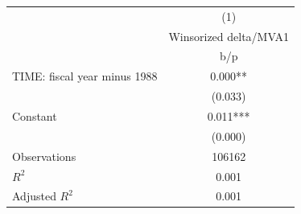 {
\def\sym#1{\ifmmode^{#1}\else\(^{#1}\)\fi}
\begin{tabular}{l*{1}{c}}
\hline\hline
                    &\multicolumn{1}{c}{(1)}\\
                    &\multicolumn{1}{c}{Winsorized delta/MVA1}\\
                    &         b/p   \\
\hline
TIME: fiscal year minus 1988&       0.000** \\
                    &     (0.033)   \\
Constant            &       0.011***\\
                    &     (0.000)   \\
\hline
Observations        &      106162   \\
\(R^{2}\)           &       0.001   \\
Adjusted \(R^{2}\)  &       0.001   \\
\hline\hline
\end{tabular}
}
